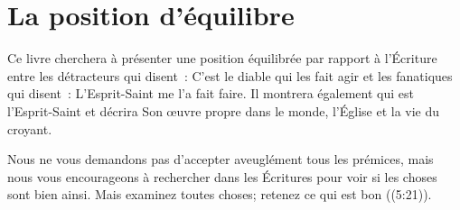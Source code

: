 \section*{La position d'équilibre}

Ce livre cherchera à présenter une position équilibrée par rapport à l'Écriture
 entre les détracteurs qui disent~: \og C'est le diable qui les fait agir \fg{}
 et les fanatiques qui disent~: \og L'Esprit-Saint me l'a fait faire. \fg{}
 Il montrera également qui est l'Esprit-Saint et décrira Son œuvre propre dans
 le monde, l'Église et la vie du croyant.

Nous ne vous demandons pas d'accepter aveuglément tous les prémices, mais nous
 vous encourageons à rechercher dans les Écritures pour voir si les choses sont
 bien ainsi. \og Mais examinez toutes choses; retenez ce qui est bon \fg{}
 ((5:21)).
\thispagestyle{chapterend}

